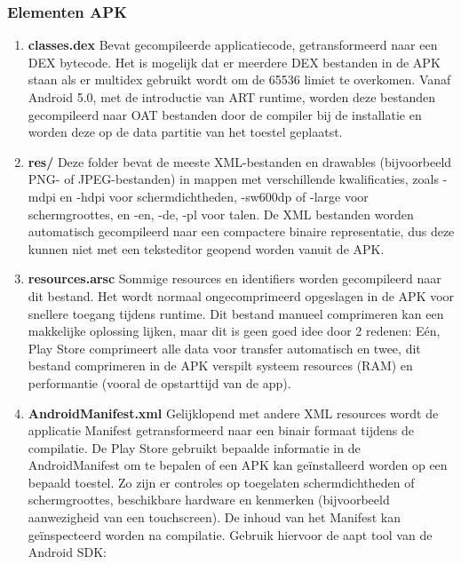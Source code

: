 \subsubsection{Elementen APK}
\begin{enumerate}
	\setlength\itemsep{2em}
	\item \textbf{classes.dex} \newline
	Bevat gecompileerde applicatiecode, getransformeerd naar een DEX bytecode. Het is mogelijk dat er meerdere DEX bestanden in de APK staan als er multidex gebruikt wordt om de 65536 limiet te overkomen. Vanaf Android 5.0, met de introductie van ART runtime, worden deze bestanden gecompileerd naar OAT bestanden door de compiler bij de installatie en worden deze op de data partitie van het toestel geplaatst. 
	\item \textbf{res/} \newline
	Deze folder bevat de meeste XML-bestanden en drawables (bijvoorbeeld PNG- of JPEG-bestanden) in mappen met verschillende kwalificaties, zoals -mdpi en -hdpi voor schermdichtheden, -sw600dp of -large voor schermgroottes, en -en, -de, -pl voor talen. De XML bestanden worden automatisch gecompileerd naar een compactere binaire representatie, dus deze kunnen niet met een teksteditor geopend worden vanuit de APK. 
	\item \textbf{resources.arsc}\newline
	Sommige resources en identifiers worden gecompileerd naar dit bestand. Het wordt normaal ongecomprimeerd opgeslagen in de APK voor snellere toegang tijdens runtime. Dit bestand manueel comprimeren kan een makkelijke oplossing lijken, maar dit is geen goed idee door 2 redenen: Eén, Play Store comprimeert alle data voor transfer automatisch en twee, dit bestand comprimeren in de APK verspilt systeem resources (RAM) en performantie (vooral de opstarttijd van de app).
	\item \textbf{AndroidManifest.xml}\newline
	Gelijklopend met andere XML resources wordt de applicatie Manifest getransformeerd naar een binair formaat tijdens de compilatie. De Play Store gebruikt bepaalde informatie in de AndroidManifest om te bepalen of een APK kan geïnstalleerd worden op een bepaald toestel. Zo zijn er controles op toegelaten schermdichtheden of schermgroottes, beschikbare hardware en kenmerken (bijvoorbeeld aanwezigheid van een touchscreen). De inhoud van het Manifest kan geïnspecteerd worden na compilatie. Gebruik hiervoor de aapt tool van de Android SDK: 
	\lstset{aboveskip=10pt, belowskip=0pt}

\end{enumerate}
